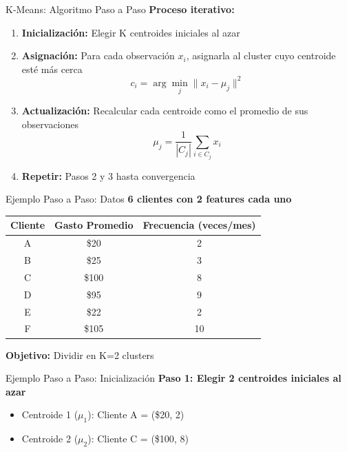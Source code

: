 \documentclass{beamer}
\begin{document}
\begin{frame}{K-Means: Algoritmo Paso a Paso}
    \textbf{Proceso iterativo:}
    \begin{enumerate}
        \item<1-> \textbf{Inicialización:} Elegir K centroides iniciales al azar
        \item<2-> \textbf{Asignación:} Para cada observación $x_i$, asignarla al cluster cuyo centroide esté más cerca
        \[
        c_i = \arg\min_{j} \|x_i - \mu_j\|^2
        \]
        \item<3-> \textbf{Actualización:} Recalcular cada centroide como el promedio de sus observaciones
        \[
        \mu_j = \frac{1}{|C_j|} \sum_{i \in C_j} x_i
        \]
        \item<4-> \textbf{Repetir:} Pasos 2 y 3 hasta convergencia
    \end{enumerate}
\end{frame}

\begin{frame}{Ejemplo Paso a Paso: Datos}
    \textbf{6 clientes con 2 features cada uno}

    \vspace{0.5em}

    \begin{table}
        \centering
        \begin{tabular}{ccc}
            \toprule
            Cliente & Gasto Promedio & Frecuencia (veces/mes) \\
            \midrule
            A & \$20 & 2 \\
            B & \$25 & 3 \\
            C & \$100 & 8 \\
            D & \$95 & 9 \\
            E & \$22 & 2 \\
            F & \$105 & 10 \\
            \bottomrule
        \end{tabular}
    \end{table}

    \vspace{0.5em}

    \textbf{Objetivo:} Dividir en K=2 clusters
\end{frame}

\begin{frame}{Ejemplo Paso a Paso: Inicialización}
    \textbf{Paso 1: Elegir 2 centroides iniciales al azar}

    \vspace{1em}

    \begin{itemize}
        \item Centroide 1 ($\mu_1$): Cliente A = (\$20, 2)
        \item Centroide 2 ($\mu_2$): Cliente C = (\$100, 8)
    \end{itemize}

    \vspace{1em}

\end{frame}
\end{document}
